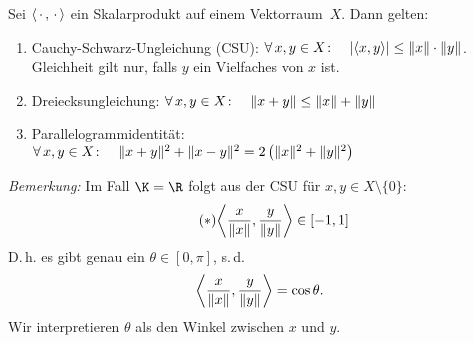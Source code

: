 \begin{thSatz}\label{vl02:satz2.8}
    Sei $\left\langle\,\cdot\,,\,\cdot\,\right\rangle$ ein Skalarprodukt auf einem Vektorraum~$X$. Dann gelten:
    \begin{enumerate}[(1)]
        \item \label{vl02:CSU}
            Cauchy-Schwarz-Ungleichung (CSU): \quad
            $\forall\,x,y\in X\colon\quad
            \lvert\left\langle x,y\right\rangle\rvert \leq \lVert x\rVert\cdot\lVert y\rVert$.\\
            Gleichheit gilt nur, falls $y$ ein Vielfaches von $x$ ist.
        \item
            Dreiecksungleichung: \quad
            $\forall\,x,y\in X\colon\quad \lVert x+y\rVert\leq\lVert x\rVert+\lVert y\rVert$
        \item
            Parallelogrammidentität:\quad
            $\forall\,x,y\in X\colon\quad
                \lVert x+y\rVert^2 + \lVert x-y\rVert^2 = 2\left( \lVert x\rVert^2+\lVert y\rVert^2
                \right)$
    \end{enumerate}
\end{thSatz}

\emph{Bemerkung:} Im Fall $\K=\R$ folgt aus der CSU für $x,y\in X\setminus\{0\}$:
\[ \label{2.8star} \tag{$\ast$}
    \SP{ \frac{x}{\norm x}, \frac{y}{\norm y} } \in [-1,1]
\] 
D.\,h. es gibt genau ein $\theta\in[0,\pi]$, s.\,d. 
\[ \left\langle \frac{x}{\lVert x\rVert}, \frac{y}{\lVert y\rVert} \right\rangle = \cos\theta 
. \]
Wir interpretieren $\theta$ als den Winkel zwischen $x$ und $y$.

